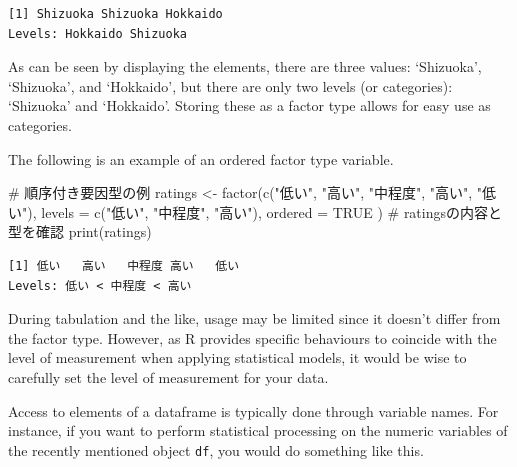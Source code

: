\documentclass[
  a4paper,
]{book}
\newenvironment{Shaded}{\begin{snugshade}}{\end{snugshade}}
\newcommand{\AttributeTok}[1]{\textcolor[rgb]{0.40,0.45,0.13}{#1}}
\newcommand{\CommentTok}[1]{\textcolor[rgb]{0.37,0.37,0.37}{#1}}
\newcommand{\ConstantTok}[1]{\textcolor[rgb]{0.56,0.35,0.01}{#1}}
\newcommand{\FunctionTok}[1]{\textcolor[rgb]{0.28,0.35,0.67}{#1}}
\newcommand{\NormalTok}[1]{\textcolor[rgb]{0.00,0.23,0.31}{#1}}
\newcommand{\OtherTok}[1]{\textcolor[rgb]{0.00,0.23,0.31}{#1}}
\newcommand{\SpecialCharTok}[1]{\textcolor[rgb]{0.37,0.37,0.37}{#1}}
\newcommand{\StringTok}[1]{\textcolor[rgb]{0.13,0.47,0.30}{#1}}
\begin{document}
\begin{verbatim}
[1] Shizuoka Shizuoka Hokkaido
Levels: Hokkaido Shizuoka
\end{verbatim}

As can be seen by displaying the elements, there are three values:
`Shizuoka', `Shizuoka', and `Hokkaido', but there are only two levels
(or categories): `Shizuoka' and `Hokkaido'. Storing these as a factor
type allows for easy use as categories.

The following is an example of an ordered factor type variable.

\begin{Shaded}
\begin{Highlighting}[]
\CommentTok{\# 順序付き要因型の例}
\NormalTok{ratings }\OtherTok{\textless{}{-}} \FunctionTok{factor}\NormalTok{(}\FunctionTok{c}\NormalTok{(}\StringTok{"低い"}\NormalTok{, }\StringTok{"高い"}\NormalTok{, }\StringTok{"中程度"}\NormalTok{, }\StringTok{"高い"}\NormalTok{, }\StringTok{"低い"}\NormalTok{),}
  \AttributeTok{levels =} \FunctionTok{c}\NormalTok{(}\StringTok{"低い"}\NormalTok{, }\StringTok{"中程度"}\NormalTok{, }\StringTok{"高い"}\NormalTok{),}
  \AttributeTok{ordered =} \ConstantTok{TRUE}
\NormalTok{)}
\CommentTok{\# ratingsの内容と型を確認}
\FunctionTok{print}\NormalTok{(ratings)}
\end{Highlighting}
\end{Shaded}

\begin{verbatim}
[1] 低い   高い   中程度 高い   低い  
Levels: 低い < 中程度 < 高い
\end{verbatim}

During tabulation and the like, usage may be limited since it doesn't
differ from the factor type. However, as R provides specific behaviours
to coincide with the level of measurement when applying statistical
models, it would be wise to carefully set the level of measurement for
your data.

Access to elements of a dataframe is typically done through variable
names. For instance, if you want to perform statistical processing on
the numeric variables of the recently mentioned object \texttt{df}, you
would do something like this.

\begin{Shaded}
\end{Shaded}
\end{document}
